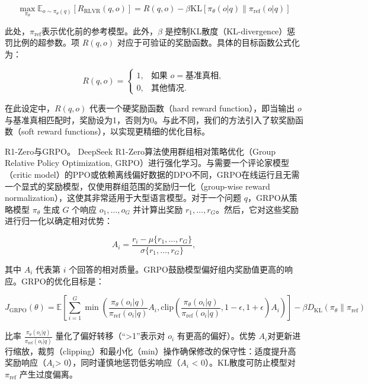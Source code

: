 \begin{equation}
\max_{\pi_\theta} \mathbb{E}_{o \sim \pi_\theta(q)} [R_{\text{RLVR}}(q, o)] = R(q, o) - \beta \text{KL} [\pi_\theta(o|q) \parallel \pi_{\text{ref}}(o|q)]
\end{equation}

此处，$ \pi_{\text{ref}} $表示优化前的参考模型。此外，$ \beta $  是控制KL散度（KL-divergence）惩罚比例的超参数。项 $ R(q, o) $ 对应于可验证的奖励函数。具体的目标函数公式化为：

\begin{equation}
R(q, o) =
\begin{cases}
  1, & \text{如果 } o = \text{基准真相}, \\
  0, & \text{其他情况}.
\end{cases}
\end{equation}

在此设定中，$ R(q, o) $ 代表一个硬奖励函数（hard reward function），即当输出 $ o $ 与基准真相匹配时，奖励设为1，否则为0。与此不同，我们的方法引入了软奖励函数（soft reward functions），以实现更精细的优化目标。

R1-Zero与GRPO。 DeepSeek R1-Zero算法使用群组相对策略优化（Group Relative Policy Optimization, GRPO）进行强化学习。与需要一个评论家模型（critic model）的PPO或依赖离线偏好数据的DPO不同，GRPO在线运行且无需一个显式的奖励模型，仅使用群组范围的奖励归一化（group-wise reward normalization），这使其非常适用于大型语言模型。对于一个问题 $ q $，GRPO从策略模型 $ \pi_\theta $ 生成 $ G $ 个响应 $ {o_1, \dots, o_G} $ 并计算出奖励 $ {r_1, \dots, r_G} $。然后，它对这些奖励进行归一化以确定相对优势：

\begin{equation}
A_i = \frac{r_i - \mu\{r_1, \dots, r_G\}}{\sigma\{r_1, \dots, r_G\}},
\end{equation}

其中 $ A_i $ 代表第 $ i $ 个回答的相对质量。GRPO鼓励模型偏好组内奖励值更高的响应。GRPO的优化目标是：

\begin{equation}
J_{\text{GRPO}}(\theta) = \mathbb{E} \left[ \sum_{i=1}^{G} \min\left( \frac{\pi_\theta(o_i|q)}{\pi_{\text{ref}}(o_i|q)} A_i, \text{clip}\left(\frac{\pi_\theta(o_i|q)}{\pi_{\text{ref}}(o_i|q)}, 1 - \epsilon, 1 + \epsilon \right) A_i \right) \right] - \beta D_{\text{KL}}(\pi_\theta \parallel \pi_{\text{ref}})
\end{equation}

比率 $ \frac{\pi_\theta(o_i|q)}{\pi_{\text{ref}}(o_i|q)} $ 量化了偏好转移（“>1”表示对 $ o_i $ 有更高的偏好）。优势 $ A_i $对更新进行缩放，裁剪（clipping）和最小化（min）操作确保修改的保守性：适度提升高奖励响应（$ A_i $> 0），同时谨慎地惩罚低劣响应（$A_i$ < 0）。KL散度可防止模型对 $ \pi_{\text{ref}} $ 产生过度偏离。

